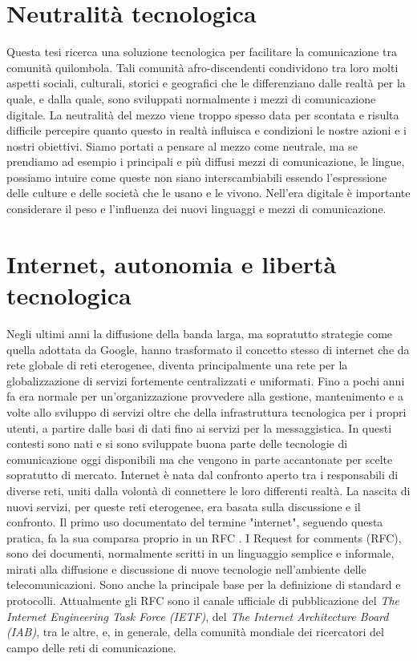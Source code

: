 \section{Neutralità tecnologica}
Questa tesi ricerca una soluzione tecnologica per facilitare la
comunicazione tra comunità quilombola. Tali comunità
afro-discendenti condividono tra loro molti aspetti sociali,
culturali, storici e geografici che le differenziano dalle realtà per
la quale, e dalla quale, sono sviluppati normalmente i mezzi di
comunicazione digitale. La neutralità del mezzo viene troppo spesso
data per scontata e risulta difficile percepire quanto questo in
realtà influisca e condizioni le nostre azioni e i nostri
obiettivi. Siamo portati a pensare al mezzo come neutrale, ma se
prendiamo ad esempio i principali e più diffusi mezzi di
comunicazione, le lingue, possiamo intuire come queste non siano
interscambiabili essendo l'espressione delle culture e delle società
che le usano e le vivono. Nell'era digitale è importante considerare
il peso e l'influenza dei nuovi linguaggi e mezzi di comunicazione.

\section{Internet, autonomia e libertà tecnologica}
Negli ultimi anni la diffusione della banda larga, ma sopratutto
strategie come quella adottata da Google, hanno trasformato il
concetto stesso di internet che da rete globale di reti eterogenee,
diventa principalmente una rete per la globalizzazione di servizi
fortemente centralizzati e uniformati. Fino a pochi anni fa era
normale per un'organizzazione provvedere alla gestione, mantenimento e
a volte allo sviluppo di servizi oltre che della infrastruttura
tecnologica per i propri utenti, a partire dalle basi di dati fino ai
servizi per la messaggistica. In questi contesti sono nati e si sono
sviluppate buona parte delle tecnologie di comunicazione oggi
disponibili ma che vengono in parte accantonate per scelte sopratutto
di mercato. Internet è nata dal confronto aperto tra i responsabili di
diverse reti, uniti dalla volontà di connettere le loro differenti
realtà. La nascita di nuovi servizi, per queste reti eterogenee, era
basata sulla discussione e il confronto. Il primo uso documentato del
termine "internet", seguendo questa pratica, fa la sua comparsa
proprio in un RFC \citep{RFC675}. I Request for comments (RFC), sono
dei documenti, normalmente scritti in un linguaggio semplice e
informale, mirati alla diffusione e discussione di nuove tecnologie
nell'ambiente delle telecomunicazioni. Sono anche la principale base
per la definizione di standard e protocolli. Attualmente gli RFC sono
il canale ufficiale di pubblicazione del \emph{The Internet
  Engineering Task Force (IETF)}, del \emph{The Internet Architecture
  Board (IAB)}, tra le altre, e, in generale, della comunità mondiale
dei ricercatori del campo delle reti di comunicazione.

